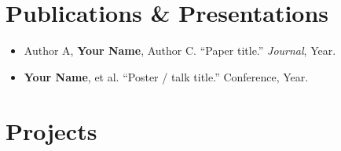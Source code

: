 \documentclass[letterpaper,10pt]{article}
\makeatletter
\newcommand{\resumeItem}[1]{
  \item{\small\setlength{\baselineskip}{10pt} #1 \vspace{-2pt}}
}
\newcommand{\resumeProjectHeading}[2]{
    \item
    \begin{tabular*}{\textwidth}{@{}l@{\extracolsep{\fill}}r@{}}
      \small#1 & \small\textit{#2} \\
    \end{tabular*}\vspace{-4pt}
}
\newcommand{\resumeSubHeadingListStart}{\begin{itemize}[leftmargin=0in, label={}, topsep=0pt, partopsep=0pt]}
\newcommand{\resumeSubHeadingListEnd}{\end{itemize}}
\newcommand{\resumeItemListStart}{\begin{itemize}[leftmargin=0.15in, label={$\bullet$}, topsep=0pt, partopsep=0pt, itemsep=3pt, parsep=0pt]}
\newcommand{\resumeItemListEnd}{\end{itemize}}
\makeatother
\begin{document}
\section{Publications \& Presentations}
\resumeSubHeadingListStart
  \resumeItem{Author A, \textbf{Your Name}, Author C. ``Paper title.'' \textit{Journal}, Year.}
  \resumeItem{\textbf{Your Name}, et al. ``Poster / talk title.'' Conference, Year.}
\resumeSubHeadingListEnd
\section{Projects}
\resumeSubHeadingListStart
\resumeSubHeadingListEnd
\end{document}
